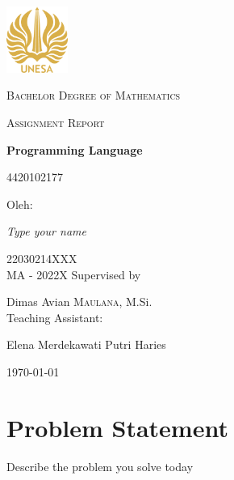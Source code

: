 \documentclass[english,12pt,a4paper,final]{article}
\begin{document}
	\begin{titlepage}
		\centering
		\includegraphics[width=0.15\textwidth]{logounesa.png}\par\vspace{1cm}
		{\large\textsc{Bachelor Degree of Mathematics} \par}
		\vspace{1cm}
		{\Large \textsc{Assignment Report}\par}
		\vspace{1.5cm}
		{\huge\bfseries Programming Language\par}
		{\Large \textsc{4420102177}\par}
		\vspace{2cm}
		Oleh:\\
		{\Large\itshape Type your name\par}
		22030214XXX\\
		MA - 2022X
		\vfill
		Supervised by\par
		Dimas Avian \textsc{Maulana}, M.Si.\\
		
		\vfill
		Teaching Assistant:\par
		Elena Merdekawati Putri Haries
		\vfill
		{\large \today\par}
	\end{titlepage}
	\section{Problem Statement}
	Describe the problem you solve today
\end{document}
